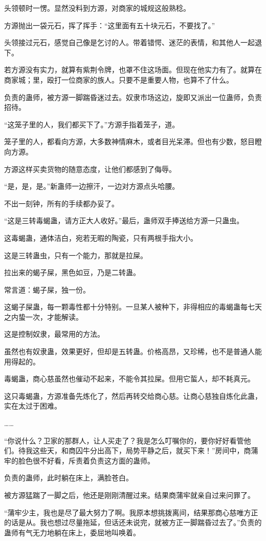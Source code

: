 \begin{this_body}
头领顿时一愣。显然没料到方源，对商家的城规这般熟稔。

方源抛出一袋元石，挥了挥手：“这里面有五十块元石，不要找了。”

头领接过元石，感觉自己像是乞讨的人。带着错愕、迷茫的表情，和其他人一起退下。

若方源没有实力，就算有紫荆令牌，也罩不住这场面。但现在他实力有了。就算在商家城；里，殴打一位商家的族人。只要不是重要人物，也算不了什么。

负责的蛊师，被方源一脚踹昏迷过去。奴隶市场这边，旋即又派出一位蛊师，负责招待。

“这笼子里的人，我们都买下了。”方源手指着笼子，道。

笼子里的人，都看向方源，大多数神情麻木，或者目光呆滞。但也有少数，怒目瞪向方源。

方源这样买卖货物的随意态度，让他们都感到了侮辱。

“是，是，是。”新蛊师一边擦汗，一边对方源点头哈腰。

不出一刻钟，所有的手续都办妥了。

“这是三转毒蝎蛊，请方正大人收好。”最后，蛊师双手捧送给方源一只蛊虫。

这毒蝎蛊，通体洁白，宛若无暇的陶瓷，只有两根手指大小。

这是三转蛊虫，只有一个能力，那就是拉屎。

拉出来的蝎子屎，黑色如豆，乃是二转蛊。

常言道：蝎子屎，独一份。

这蝎子屎蛊，每一颗毒性都十分特别。一旦某人被种下，非得相应的毒蝎蛊每七天之内蛰一次，才能解读。

这是控制奴隶，最常用的方法。

虽然也有奴隶蛊，效果更好，但却是五转蛊。价格高昂，又珍稀，也不是普通人能用得起的。

毒蝎蛊，商心慈虽然也催动不起来，不能令其拉屎。但用它蜇人，却不耗真元。

这只毒蝎蛊，方源准备先炼化了，然后再转交给商心慈。让商心慈独自炼化此蛊，实在太过于困难。

……

“你说什么？卫家的那群人，让人买走了？我是怎么叮嘱你的，要你好好看管他们。待我这些天，和商囚牛分出高下，局势平静之后，就买下来！”房间中，商蒲牢的脸色很不好看，斥责着负责这方面的蛊师。

负责的蛊师，此时躺在床上，满脸苍白。

被方源猛踹了一脚之后，他还是刚刚清醒过来。结果商蒲牢就亲自过来问罪了。

“蒲牢少主，我也是尽了最大努力了啊。我原本想挑拨离间，结果那商心慈唯方正的话是从。我也想过尽量拖延，但话还未说完，就被方正一脚踹昏过去了。”负责的蛊师有气无力地躺在床上，委屈地叫唤着。


\end{this_body}
